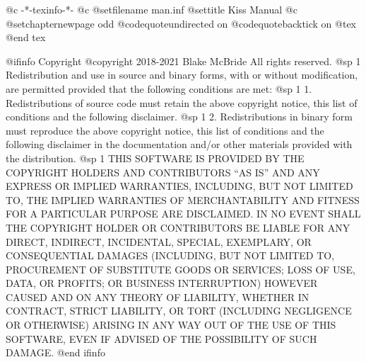     @c -*-texinfo-*-
@c %
@setfilename man.inf
@settitle Kiss Manual
@c %
@setchapternewpage odd
@codequoteundirected on
@codequotebacktick on
@tex
\global\def\linkcolor{0 0 1}  %
\global\def\urlcolor{0 0 1}   %
@end tex

@ifinfo
Copyright  @copyright{} 2018-2021 Blake McBride
All rights reserved.
@sp 1
Redistribution and use in source and binary forms, with or without
modification, are permitted provided that the following conditions are
met:
@sp 1
1. Redistributions of source code must retain the above copyright
notice, this list of conditions and the following disclaimer.
@sp 1
2. Redistributions in binary form must reproduce the above copyright
notice, this list of conditions and the following disclaimer in the
documentation and/or other materials provided with the distribution.
@sp 1
THIS SOFTWARE IS PROVIDED BY THE COPYRIGHT HOLDERS AND CONTRIBUTORS
``AS IS'' AND ANY EXPRESS OR IMPLIED WARRANTIES, INCLUDING, BUT NOT
LIMITED TO, THE IMPLIED WARRANTIES OF MERCHANTABILITY AND FITNESS FOR
A PARTICULAR PURPOSE ARE DISCLAIMED. IN NO EVENT SHALL THE COPYRIGHT
HOLDER OR CONTRIBUTORS BE LIABLE FOR ANY DIRECT, INDIRECT, INCIDENTAL,
SPECIAL, EXEMPLARY, OR CONSEQUENTIAL DAMAGES (INCLUDING, BUT NOT
LIMITED TO, PROCUREMENT OF SUBSTITUTE GOODS OR SERVICES; LOSS OF USE,
DATA, OR PROFITS; OR BUSINESS INTERRUPTION) HOWEVER CAUSED AND ON ANY
THEORY OF LIABILITY, WHETHER IN CONTRACT, STRICT LIABILITY, OR TORT
(INCLUDING NEGLIGENCE OR OTHERWISE) ARISING IN ANY WAY OUT OF THE USE
OF THIS SOFTWARE, EVEN IF ADVISED OF THE POSSIBILITY OF SUCH DAMAGE.
@end ifinfo

